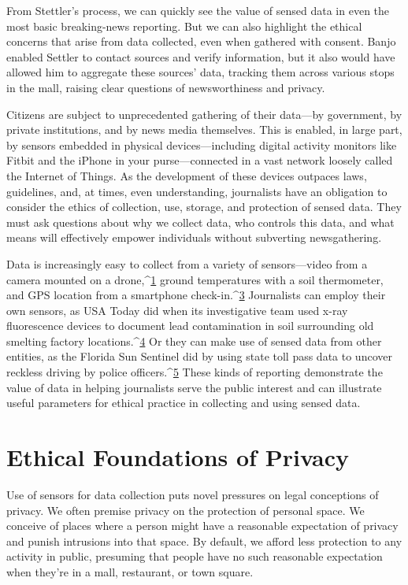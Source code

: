 From Stettler's process, we can quickly see the value of sensed data in even
the most basic breaking-news reporting. But we can also highlight the ethical
concerns that arise from data collected, even when gathered with consent.
Banjo enabled Settler to contact sources and verify information, but it
also would have allowed him to aggregate these sources' data, tracking them
across various stops in the mall, raising clear questions of newsworthiness
and privacy.

Citizens are subject to unprecedented gathering of their data—by government,
by private institutions, and by news media themselves. This is enabled,
in large part, by sensors embedded in physical devices—including digital
activity monitors like Fitbit and the iPhone in your purse—connected in
a vast network loosely called the Internet of Things. As the development
of these devices outpaces laws, guidelines, and, at times, even understanding,
journalists have an obligation to consider the ethics of collection, use, storage, and protection of sensed data. They must ask questions about why we collect data, who controls this data, and what means will effectively
empower individuals without subverting newsgathering.

Data is increasingly easy to collect from a variety of sensors—video from a
camera mounted on a drone,^{\href{#endnotes-culver}{1}} ground temperatures with a soil thermometer, and GPS location from a smartphone check-in.^{\href{#endnotes-culver}{3}} Journalists can employ
their own sensors, as USA Today did when its investigative team used x-ray
fluorescence devices to document lead contamination in soil surrounding
old smelting factory locations.^{\href{#endnotes-culver}{4}} Or they can make use of sensed data from
other entities, as the Florida Sun Sentinel did by using state toll pass data to
uncover reckless driving by police officers.^{\href{#endnotes-culver}{5}}
These kinds of reporting demonstrate the value of data in helping journalists
serve the public interest and can illustrate useful parameters for ethical
practice in collecting and using sensed data.

\section{Ethical Foundations of Privacy}
Use of sensors for data collection puts novel pressures on legal conceptions
of privacy. We often premise privacy on the protection of personal space.
We conceive of places where a person might have a reasonable expectation
of privacy and punish intrusions into that space. By default, we afford less
protection to any activity in public, presuming that people have no such reasonable expectation when they're in a mall, restaurant, or town square.

